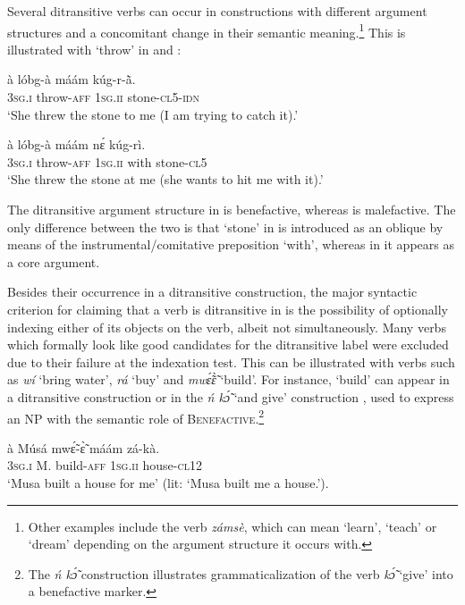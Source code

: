 \documentclass[output=paper]{langsci/langscibook}
\begin{document}
Several ditransitive verbs can occur in constructions with different argument structures and a concomitant change in their semantic meaning.\footnote{Other examples include the verb \textit{zámsè}, which can mean `learn', `teach' or `dream' depending on the argument structure it occurs with.} This is illustrated with `throw' in  and :  

\ea
\label{ex:3.pacchiarotti}
\gll à    lóbg-à    máám    kúg-r-\`{ã}.\\
\textsc{3sg.i}  throw-\textsc{aff}  \textsc{1sg.ii}  stone-\textsc{cl5-idn} \\
\glt `She threw the stone to me (I am trying to catch it).'  
\z

\ea
\label{ex:4.pacchiarotti}
\gll à    lóbg-à    máám    nɛ́  kúg-rì. \\
\textsc{3sg.i}    throw-\textsc{aff}  \textsc{1sg.ii}    with  stone-\textsc{cl5} \\
\glt `She threw the stone at me (she wants to hit me with it).'
\z

The ditransitive argument structure in  is benefactive, whereas  is malefactive. The only difference between the two is that `stone' in  is introduced as an oblique by means of the instrumental/comitative preposition `with', whereas in  it appears as a core argument. 

Besides their occurrence in a ditransitive construction, the major syntactic criterion for claiming that a verb is ditransitive in  is the possibility of optionally indexing either of its objects on the verb, albeit not simultaneously. Many verbs which formally look like good candidates for the ditransitive label were excluded due to their failure at the indexation test. This can be illustrated with verbs such as \textit{wí} `bring water', \textit{rá} `buy' and \textit{mw\'{\~{ɛ}}\`{\~{ɛ}}} `build'. For instance, `build' can appear in a ditransitive construction  or in the \textit{ń k\'{\~{ɔ}}} `and give' construction , used to express an NP with the semantic role of \textsc{Benefactive}.\footnote{The\textit{ ń k\'{\~{ɔ}}} construction illustrates grammaticalization of the verb \textit{k\'{\~{ɔ}}} `give' into a benefactive marker.} 

\ea
\label{ex:5.pacchiarotti}
\gll à    Músá  mwɛ̃́-ɛ̃̀    máám    zá-kà. \\
\textsc{3sg.i}    M.  build-\textsc{aff}  \textsc{1sg.ii}    house-\textsc{cl12} \\
\glt `Musa built a house for me' (lit: `Musa built me a house.'). 
\z
\end{document}
